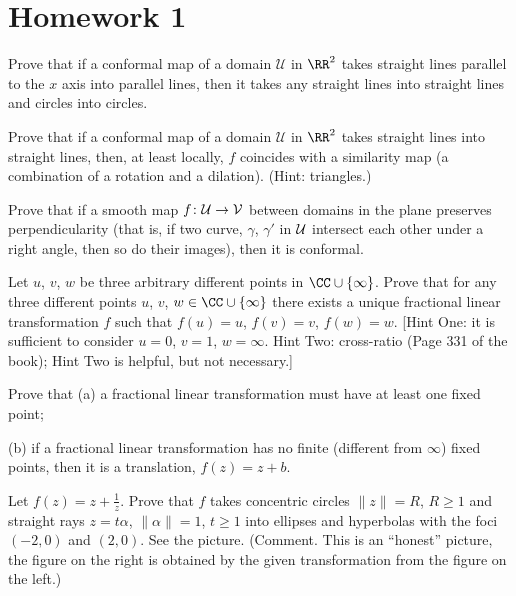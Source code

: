 
\section*{Homework 1}\renewcommand{\leftmark}{Homework 1}

\begin{exercise}
Prove that if a conformal map of a domain $\mathcal{U}$ in
$\RR^{2}$ takes straight lines parallel to the $x$ axis into
parallel lines, then it takes any straight lines into straight
lines and circles into circles. 
\end{exercise}
\begin{exercise}
Prove that if a conformal map of a domain $\mathcal{U}$ in
$\RR^{2}$ takes straight lines into straight lines, then, at
least locally, $f$ coincides with a similarity map (a combination
of a rotation and a dilation). (Hint: triangles.) 
\end{exercise}
\begin{exercise}
Prove that if a smooth map $f\colon{\cal U}\to{\cal V}$ between
domains in the plane preserves perpendicularity (that is, if two
curve, $\gamma$, $\gamma'$ in ${\cal U}$ intersect each other
under a right angle, then so do their images), then it is
conformal. 
\end{exercise}
\begin{exercise}
Let $u$, $v$, $w$ be three arbitrary different points in
$\CC\cup\{\infty\}$. Prove that for any three different points
$u$, $v$, $w\in\CC\cup\{\infty\}$ there exists a unique
fractional linear transformation $f$ such that $f (u) = u$, $f
(v) = v$, $f (w) = w$. [Hint One: it is sufficient to consider 
$u = 0$, $v = 1$, $w = \infty$. Hint Two: cross-ratio (Page 331 of the
book); Hint Two is helpful, but not necessary.]  
\end{exercise}
\begin{exercise}
Prove that (a) a fractional linear transformation must have at least one fixed point;

\noindent(b) if a fractional linear transformation has no finite (different from $\infty$) fixed points, then
it is a translation, $f (z) = z + b$.
\end{exercise}
\begin{exercise}
Let $f (z) = z + \frac{1}{z}$. Prove that $f$ takes concentric
circles $\|z\| = R$, $R \geq 1$ and straight rays $z = t\alpha$,
$\|\alpha\| = 1$, $t\geq 1$ into ellipses and hyperbolas with the
foci $(−2, 0)$ and $(2, 0)$. See the picture. (Comment. This is
an ``honest'' picture, the figure on the right is obtained by the
given transformation from the figure on the left.) 
\end{exercise}
